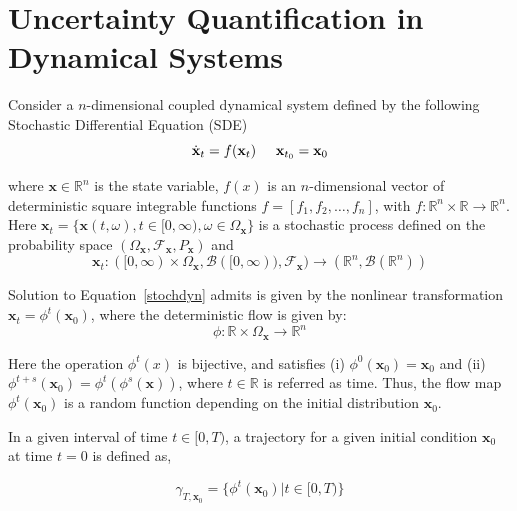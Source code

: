 \chapter{Uncertainty Quantification in Dynamical Systems}
\label{chap:uq}

Consider a $n$-dimensional coupled dynamical system defined by the following Stochastic Differential Equation (SDE)
\begin{equation}
\label{stochdyn}
\dot{\mathbf{x}}_t = f(\mathbf{x}_t)  \hspace{5 mm} \textbf{x}_{t_0} = \textbf{x}_0
\end{equation}

\noindent where $\textbf{x} \in \mathbb{R}^n$ is the state variable, $f(x)$ is an $n$-dimensional vector of deterministic square integrable functions $f = [f_1,f_2,\ldots,f_n]$, with  $f: \mathbb{R}^n \times \mathbb{R}  \rightarrow \mathbb{R}^n$. Here $\mathbf{x}_t = \lbrace\mathbf{x}(t,\omega) , t \in [0,\infty) , \omega \in \Omega_{\mathbf{x}} \rbrace$ is a stochastic process defined on the probability space $(\Omega_\mathbf{x},\mathcal{F}_\mathbf{x},P_\mathbf{x})$ and
\begin{equation}
\textbf{x}_t :([0,\infty)\times \Omega_\mathbf{x}, \mathcal{B}([0,\infty)), \mathcal{F}_\mathbf{x}) \rightarrow (\mathbb{R}^n, \mathcal{B}(\mathbb{R}^n))
\end{equation}

Solution to Equation~\ref{stochdyn} admits is given by the nonlinear transformation $\textbf{x}_t = \phi^t(\mathbf{x}_0)$, where the deterministic flow is given by:
\begin{equation}
\label{stochflow}
\phi : \mathbb{R} \times \Omega_\mathbf{x}  \rightarrow \mathbb{R}^n
\end{equation}

Here the operation $\phi^t(x)$ is bijective, and satisfies (i) $\phi^0(\textbf{x}_0) = \textbf{x}_0$ and (ii) $\phi^{t+s}(\textbf{x}_0) = \phi^t(\phi^s(\textbf{x}))$, where $t \in \mathbb{R}$ is referred as time. Thus, the flow map $\phi^t(\mathbf{x}_0)$ is a random function depending on the initial distribution $\mathbf{x}_0$. 

\noindent In a given interval of time $t \in [0,T)$, a trajectory for a given initial condition $\textbf{x}_{0}$ at time $t = 0$ is defined as,

\begin{equation}
\label{gamma}
\gamma_{T,\textbf{x}_0} = \lbrace \phi^t(\textbf{x}_{0}) | t \in [0,T) \rbrace 
\end{equation}

